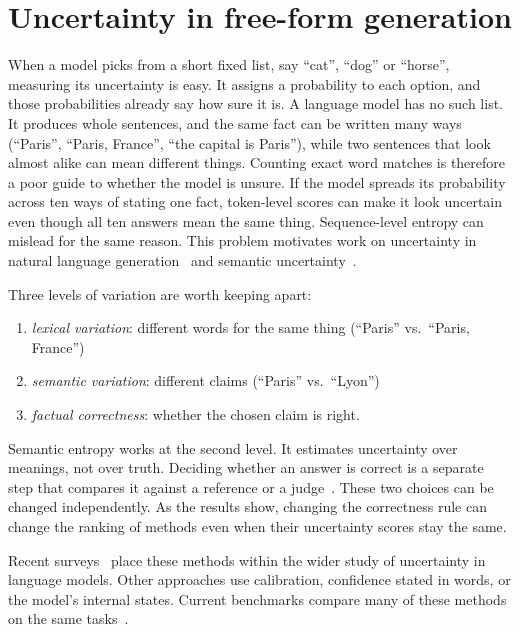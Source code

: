 \section{Uncertainty in free-form generation}
\label{sec:uncertainty-freeform}

When a model picks from a short fixed list, say ``cat'', ``dog'' or ``horse'',
measuring its uncertainty is easy. It assigns a probability to each option, and
those probabilities already say how sure it is. A language model has no such
list. It produces whole sentences, and the same fact can be written many ways
(``Paris'', ``Paris, France'', ``the capital is Paris''), while two sentences
that look almost alike can mean different things. Counting exact word matches
is therefore a poor guide to whether the model is unsure. If the model spreads
its probability across ten ways of stating one fact, token-level scores can
make it look uncertain even though all ten answers mean the same thing.
Sequence-level entropy can mislead for the same reason. This problem motivates
work on uncertainty in natural language
generation~\cite{baan_uncertainty_nlg_2023} and semantic
uncertainty~\cite{kuhn_semantic_uncertainty_2023}.

Three levels of variation are worth keeping apart:

\begin{enumerate}
  \item \emph{lexical variation}: different words for the same thing
    (``Paris'' vs.\ ``Paris, France'')
  \item \emph{semantic variation}: different claims
    (``Paris'' vs.\ ``Lyon'')
  \item \emph{factual correctness}: whether the chosen claim is right.
\end{enumerate}

Semantic entropy works at the second level. It estimates uncertainty over
meanings, not over truth. Deciding whether an answer is correct is a separate
step that compares it against a reference or a
judge~\cite{semantic_entropy_nature_2024}. These two choices can be changed
independently. As the results show, changing the correctness rule can change
the ranking of methods even when their uncertainty scores stay the same.

Recent surveys~\cite{shorinwa_uq_llm_survey_2024,%
liu_uq_confidence_calibration_survey_2025} place these methods within the wider
study of uncertainty in language models. Other approaches use calibration,
confidence stated in words, or the model's internal states. Current benchmarks
compare many of these methods on the same tasks~\cite{lm_polygraph_vashurin_2025}.

